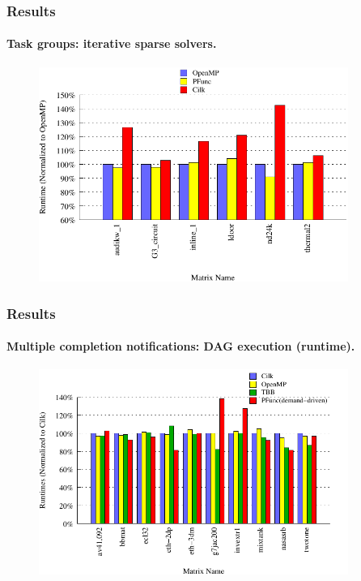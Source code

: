 \documentclass{beamer}
\begin{document}
\begin{frame}[fragile]
\frametitle{Results}
\framesubtitle{Task groups: iterative sparse solvers.}
\begin{figure}
\includegraphics[width=0.9\textwidth]{figs/cg_8}
\label{fig:cg}
\end{figure}
\end{frame}

\begin{frame}[fragile]
\frametitle{Results}
\framesubtitle{Multiple completion notifications: DAG execution (runtime).}
\begin{figure}
\includegraphics[width=0.9\textwidth]{figs/dag_speedup}
\label{fig:dag_speedup}
\end{figure}
\end{frame}
\end{document}
